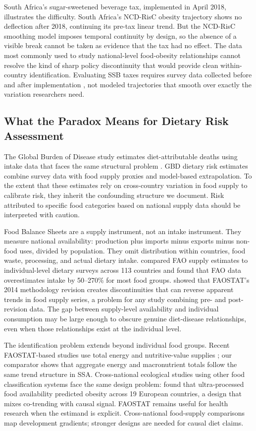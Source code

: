 \documentclass[letterpaper,11pt,leqno]{article}
\begin{document}
South Africa's sugar-sweetened beverage tax, implemented in April 2018, illustrates the difficulty. South Africa's NCD-RisC obesity trajectory shows no deflection after 2018, continuing its pre-tax linear trend. But the NCD-RisC smoothing model imposes temporal continuity by design, so the absence of a visible break cannot be taken as evidence that the tax had no effect. The data most commonly used to study national-level food-obesity relationships cannot resolve the kind of sharp policy discontinuity that would provide clean within-country identification. Evaluating SSB taxes requires survey data collected before and after implementation \citep{colchero2016}, not modeled trajectories that smooth over exactly the variation researchers need.

\subsection{What the Paradox Means for Dietary Risk Assessment}

The Global Burden of Disease study estimates diet-attributable deaths using intake data that faces the same structural problem \citep{gbd2019}. GBD dietary risk estimates combine survey data with food supply proxies and model-based extrapolation. To the extent that these estimates rely on cross-country variation in food supply to calibrate risk, they inherit the confounding structure we document. Risk attributed to specific food categories based on national supply data should be interpreted with caution.

Food Balance Sheets are a supply instrument, not an intake instrument. They measure national availability: production plus imports minus exports minus non-food uses, divided by population. They omit distribution within countries, food waste, processing, and actual dietary intake. \citet{delgobbo2015} compared FAO supply estimates to individual-level dietary surveys across 113 countries and found that FAO data overestimates intake by 50--270\% for most food groups. \citet{vonderschmidt2024} showed that FAOSTAT's 2014 methodology revision creates discontinuities that can reverse apparent trends in food supply series, a problem for any study combining pre- and post-revision data. The gap between supply-level availability and individual consumption may be large enough to obscure genuine diet-disease relationships, even when those relationships exist at the individual level.

The identification problem extends beyond individual food groups. Recent FAOSTAT-based studies use total energy and nutritive-value supplies \citep{siminiuc2025,delgadopertinez2026}; our comparator shows that aggregate energy and macronutrient totals follow the same trend structure in SSA. Cross-national ecological studies using other food classification systems face the same design problem: \citet{monteiro2018} found that ultra-processed food availability predicted obesity across 19 European countries, a design that mixes co-trending with causal signal. FAOSTAT remains useful for health research when the estimand is explicit. Cross-national food-supply comparisons map development gradients; stronger designs are needed for causal diet claims.
\end{document}
